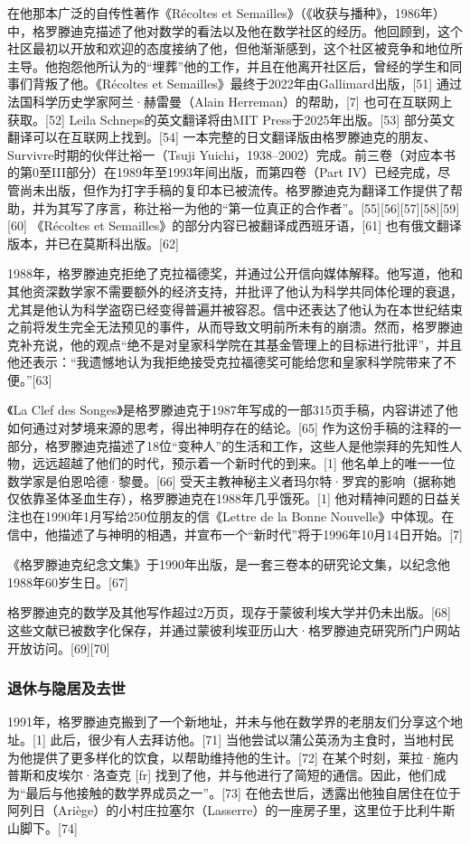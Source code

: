 在他那本广泛的自传性著作《Récoltes et Semailles》（《收获与播种》，1986年）中，格罗滕迪克描述了他对数学的看法以及他在数学社区的经历。他回顾到，这个社区最初以开放和欢迎的态度接纳了他，但他渐渐感到，这个社区被竞争和地位所主导。他抱怨他所认为的“埋葬”他的工作，并且在他离开社区后，曾经的学生和同事们背叛了他。《Récoltes et Semailles》最终于2022年由Gallimard出版，[51] 通过法国科学历史学家阿兰·赫雷曼（Alain Herreman）的帮助，[7] 也可在互联网上获取。[52] Leila Schneps的英文翻译将由MIT Press于2025年出版。[53] 部分英文翻译可以在互联网上找到。[54] 一本完整的日文翻译版由格罗滕迪克的朋友、Survivre时期的伙伴辻裕一（Tsuji Yuichi，1938–2002）完成。前三卷（对应本书的第0至III部分）在1989年至1993年间出版，而第四卷（Part IV）已经完成，尽管尚未出版，但作为打字手稿的复印本已被流传。格罗滕迪克为翻译工作提供了帮助，并为其写了序言，称辻裕一为他的“第一位真正的合作者”。[55][56][57][58][59][60] 《Récoltes et Semailles》的部分内容已被翻译成西班牙语，[61] 也有俄文翻译版本，并已在莫斯科出版。[62]

1988年，格罗滕迪克拒绝了克拉福德奖，并通过公开信向媒体解释。他写道，他和其他资深数学家不需要额外的经济支持，并批评了他认为科学共同体伦理的衰退，尤其是他认为科学盗窃已经变得普遍并被容忍。信中还表达了他认为在本世纪结束之前将发生完全无法预见的事件，从而导致文明前所未有的崩溃。然而，格罗滕迪克补充说，他的观点“绝不是对皇家科学院在其基金管理上的目标进行批评”，并且他还表示：“我遗憾地认为我拒绝接受克拉福德奖可能给您和皇家科学院带来了不便。”[63]

《La Clef des Songes》是格罗滕迪克于1987年写成的一部315页手稿，内容讲述了他如何通过对梦境来源的思考，得出神明存在的结论。[65] 作为这份手稿的注释的一部分，格罗滕迪克描述了18位“变种人”的生活和工作，这些人是他崇拜的先知性人物，远远超越了他们的时代，预示着一个新时代的到来。[1] 他名单上的唯一一位数学家是伯恩哈德·黎曼。[66] 受天主教神秘主义者玛尔特·罗宾的影响（据称她仅依靠圣体圣血生存），格罗滕迪克在1988年几乎饿死。[1] 他对精神问题的日益关注也在1990年1月写给250位朋友的信《Lettre de la Bonne Nouvelle》中体现。在信中，他描述了与神明的相遇，并宣布一个“新时代”将于1996年10月14日开始。[7]

《格罗滕迪克纪念文集》于1990年出版，是一套三卷本的研究论文集，以纪念他1988年60岁生日。[67]

格罗滕迪克的数学及其他写作超过2万页，现存于蒙彼利埃大学并仍未出版。[68] 这些文献已被数字化保存，并通过蒙彼利埃亚历山大·格罗滕迪克研究所门户网站开放访问。[69][70]
\subsubsection{退休与隐居及去世}
1991年，格罗滕迪克搬到了一个新地址，并未与他在数学界的老朋友们分享这个地址。[1] 此后，很少有人去拜访他。[71] 当他尝试以蒲公英汤为主食时，当地村民为他提供了更多样化的饮食，以帮助维持他的生计。[72] 在某个时刻，莱拉·施内普斯和皮埃尔·洛查克 [fr] 找到了他，并与他进行了简短的通信。因此，他们成为“最后与他接触的数学界成员之一”。[73] 在他去世后，透露出他独自居住在位于阿列日（Ariège）的小村庄拉塞尔（Lasserre）的一座房子里，这里位于比利牛斯山脚下。[74]


